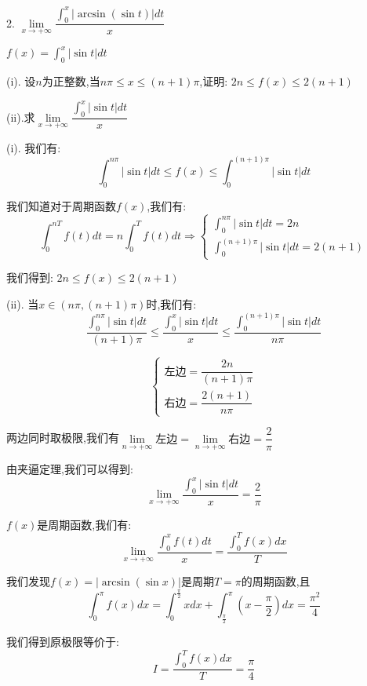 2. $\lim\limits_{x\rightarrow+\infty}\dfrac{\int_{0}^{x}|\arcsin(\sin t)|dt}{x}$
\begin{lemma}[周期函数积分性质]\label{lem: 周期函数积分性质}
	$f(x)=\int_{0}^{x}|\sin t|dt$
	
	(i). 设$n$为正整数,当$n\pi\leq x\leq (n+1)\pi$,证明: $2n\leq f(x)\leq 2(n+1)$
	
	(ii).求$\lim\limits_{x\rightarrow+\infty}\dfrac{\int_{0}^{x}|\sin t|dt}{x}$
	\begin{solution}
		
		(i). 我们有: 
		$$\int_{0}^{n\pi}|\sin t|dt\leq f(x)\leq \int_{0}^{(n+1)\pi}|\sin t|dt$$
		
		我们知道对于周期函数$f(x)$,我们有: 
		$$\int_{0}^{nT}f(t)dt=n\int_{0}^{T}f(t)dt\Rightarrow \left\lbrace 
		\begin{array}{l}
			\int_{0}^{n\pi}|\sin t|dt=2n\\
			\int_{0}^{(n+1)\pi}|\sin t|dt=2(n+1)
		\end{array}
		\right. $$
		
		我们得到: $2n\leq f(x)\leq 2(n+1)$
		
		(ii). 当$x\in(n\pi,(n+1)\pi)$时,我们有: 
		$$\dfrac{\int_{0}^{n\pi}|\sin t|dt}{(n+1)\pi}\leq \dfrac{\int_{0}^{x}|\sin t|dt}{x}\leq \dfrac{\int_{0}^{(n+1)\pi}|\sin t|dt}{n\pi}$$
		
		$$\left\lbrace 
		\begin{array}{l}
			\text{左边}=\dfrac{2n}{(n+1)\pi}\\
			\text{右边}=\dfrac{2(n+1)}{n\pi}
		\end{array}
		\right. $$
		
		两边同时取极限,我们有$\lim\limits_{n\rightarrow+\infty}\text{左边}=\lim\limits_{n\rightarrow+\infty}\text{右边}=\dfrac{2}{\pi}$
		
		由夹逼定理,我们可以得到: 
		$$\lim\limits_{x\rightarrow+\infty}\dfrac{\int_{0}^{x}|\sin t|dt}{x}=\dfrac{2}{\pi}$$
	\end{solution}
\end{lemma}
\begin{theorem}[周期函数性质]
	$f(x)$是周期函数,我们有: 
	$$\lim\limits_{x\rightarrow+\infty}\dfrac{\int_{0}^{x}f(t)dt}{x}=\dfrac{\int_{0}^{T}f(x)dx}{T}$$
\end{theorem}
\begin{solution}
	
	我们发现$f(x)=|\arcsin (\sin x)|$是周期$T=\pi$的周期函数,且$$\int_{0}^{\pi}f(x)dx=\int_{0}^{\frac{\pi}{2}}xdx+\int_{\frac{\pi}{2}}^{\pi}(x-\dfrac{\pi}{2})dx=\dfrac{\pi^2}{4}$$
	
	我们得到原极限等价于: 
	$$I=\dfrac{\int_{0}^{T}f(x)dx}{T}=\dfrac{\pi}{4}$$
\end{solution}


